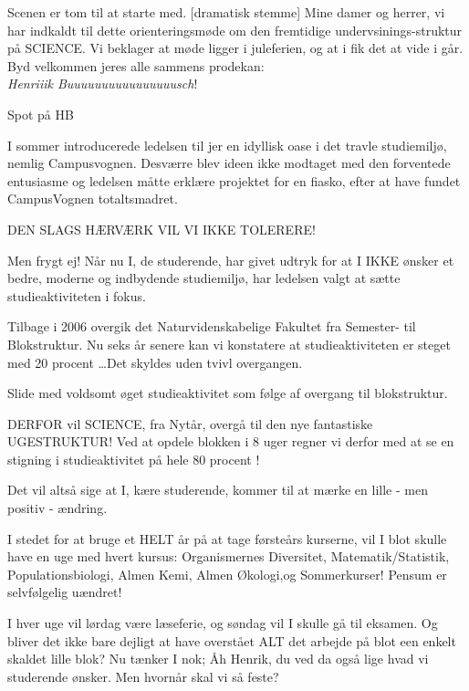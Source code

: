 \documentclass[a4paper,12pt]{article}
\begin{document}
\begin{sketch}


\scene Scenen er tom til at starte med.
[dramatisk stemme] Mine damer og herrer, vi har indkaldt til dette orienteringsmøde om den fremtidige undervsinings-struktur på SCIENCE. Vi beklager at møde ligger i juleferien, og at i fik det at vide i går. Byd velkommen jeres alle sammens prodekan:  \\ \emph{Henriiik Buuuuuuuuuuuuuuuusch}!

\scene Spot på HB

 I sommer introducerede ledelsen til jer en idyllisk oase i det travle studiemiljø, nemlig Campusvognen. Desværre blev ideen ikke modtaget med den forventede entusiasme og ledelsen måtte erklære projektet for en fiasko, efter at have fundet CampusVognen totaltsmadret.

DEN SLAGS HÆRVÆRK VIL VI IKKE TOLERERE! 

Men frygt ej! Når nu I, de studerende, har givet udtryk for at I IKKE ønsker et bedre, moderne og indbydende studiemiljø, har ledelsen valgt at sætte studieaktiviteten i fokus. 

Tilbage i 2006 overgik det Naturvidenskabelige Fakultet fra Semester- til Blokstruktur. Nu seks år senere kan vi konstatere at studieaktiviteten er steget med 20 procent \ldots Det skyldes uden tvivl overgangen.

 Slide med voldsomt øget studieaktivitet som følge af overgang til blokstruktur.

 DERFOR vil SCIENCE, fra Nytår, overgå til den nye fantastiske UGESTRUKTUR! Ved at opdele blokken i 8 uger regner vi derfor med at se en stigning i studieaktivitet på hele 80 procent !

Det vil altså sige at I, kære studerende, kommer til at mærke en lille - men positiv - ændring.

I stedet for at bruge et HELT år på at tage førsteårs kurserne, vil I blot skulle have en uge med hvert kursus: Organismernes Diversitet, Matematik/Statistik, Populationsbiologi, Almen Kemi, Almen Økologi,og Sommerkurser! Pensum er selvfølgelig uændret!

I hver uge vil lørdag være læseferie, og søndag vil I skulle gå til eksamen. 
Og bliver det ikke bare dejligt at have overstået ALT det arbejde på blot een enkelt skaldet lille blok? 
Nu tænker I nok; Åh Henrik, du ved da også lige hvad vi studerende ønsker. Men hvornår skal vi så feste?


\end{sketch}
\end{document}
